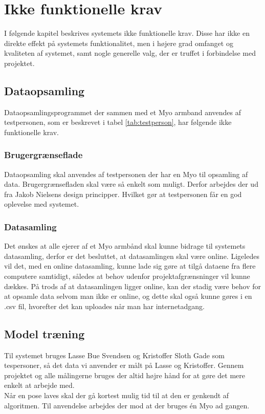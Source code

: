 \thispagestyle{fancy}
\chapter{Ikke funktionelle krav}
I følgende kapitel beskrives systemets ikke funktionelle krav. Disse har ikke en direkte effekt på systemets funktionalitet, men i højere grad omfanget og kvaliteten af systemet, samt nogle generelle valg, der er truffet i forbindelse med projektet.

\section{Dataopsamling}
Dataopsamlingsprogrammet der sammen med et Myo armband anvendes af testpersonen, som er beskrevet i tabel \ref{tab:testperson}, har følgende ikke funktionelle krav.

\subsection{Brugergrænseflade}
Dataopsamling skal anvendes af testpersonen der har en Myo til opsamling af data. Brugergrænsefladen skal være så enkelt som muligt. Derfor arbejdes der ud fra Jakob Nielsens design principper. Hvilket gør at testpersonen får en god oplevelse med systemet.

\subsection{Datasamling}
Det ønskes at alle ejerer af et Myo armbånd skal kunne bidrage til systemets datasamling, derfor er det besluttet, at datasamlingen skal være online. Ligeledes vil det, med en online datasamling, kunne lade sig gøre at tilgå dataene fra flere computere samtidigt, således at behov udenfor projektafgrænsninger vil kunne dækkes. På trods af at datasamlingen ligger online, kan der stadig være behov for at opsamle data selvom man ikke er online, og dette skal også kunne gøres i en .csv fil, hvorefter det kan uploades når man har internetadgang.

\section{Model træning}
Til systemet bruges Lasse Bue Svendsen og Kristoffer Sloth Gade som tespersoner, så det data vi anvender er målt på Lasse og Kristoffer. Gennem projektet og alle målingerne bruges der altid højre hånd for at gøre det mere enkelt at arbejde med.\\
Når en pose laves skal der gå kortest mulig tid til at den er genkendt af algoritmen. Til anvendelse arbejdes der mod at der bruges én Myo ad gangen.


